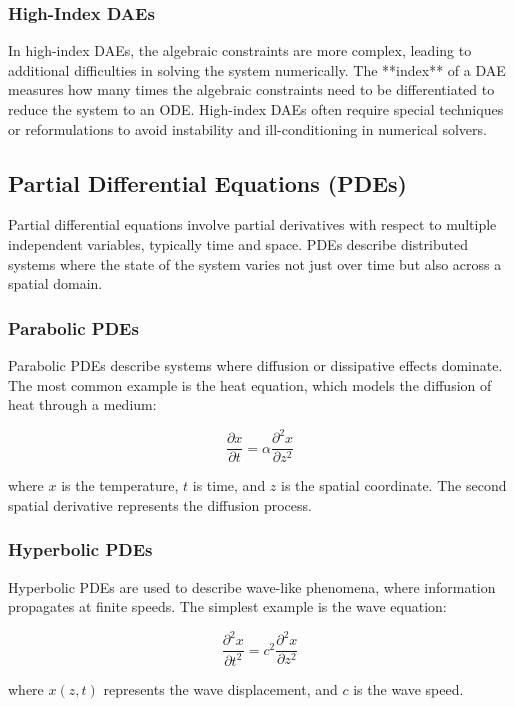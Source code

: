 \documentclass{article}
\begin{document}
\subsubsection{High-Index DAEs}

In high-index DAEs, the algebraic constraints are more complex, leading to additional difficulties in solving the system numerically. The **index** of a DAE measures how many times the algebraic constraints need to be differentiated to reduce the system to an ODE. High-index DAEs often require special techniques or reformulations to avoid instability and ill-conditioning in numerical solvers.

\subsection{Partial Differential Equations (PDEs)}

Partial differential equations involve partial derivatives with respect to multiple independent variables, typically time and space. PDEs describe distributed systems where the state of the system varies not just over time but also across a spatial domain.

\subsubsection{Parabolic PDEs}

Parabolic PDEs describe systems where diffusion or dissipative effects dominate. The most common example is the heat equation, which models the diffusion of heat through a medium:

\[
\frac{\partial x}{\partial t} = \alpha \frac{\partial^2 x}{\partial z^2}
\]

where \(x\) is the temperature, \(t\) is time, and \(z\) is the spatial coordinate. The second spatial derivative represents the diffusion process.

\subsubsection{Hyperbolic PDEs}

Hyperbolic PDEs are used to describe wave-like phenomena, where information propagates at finite speeds. The simplest example is the wave equation:

\[
\frac{\partial^2 x}{\partial t^2} = c^2 \frac{\partial^2 x}{\partial z^2}
\]

where \(x(z,t)\) represents the wave displacement, and \(c\) is the wave speed.
\end{document}
